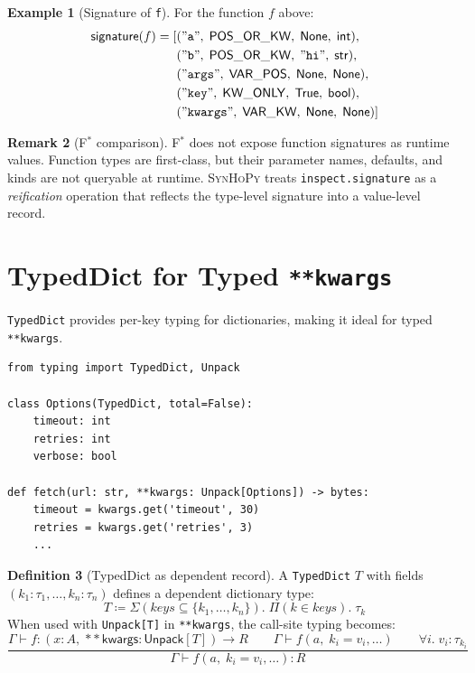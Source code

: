 \documentclass[11pt,a4paper]{report}
\theoremstyle{definition}
\newtheorem{definition}{Definition}[chapter]
\newtheorem{example}[definition]{Example}
\newtheorem{remark}[definition]{Remark}
\theoremstyle{plain}
\newcommand{\PyNone}{\mathsf{None}}
\newcommand{\defeq}{\coloneqq}
\newcommand{\fstar}{F$^{*}$}
\newcommand{\synhopy}{\textsc{SynHoPy}}
\begin{document}
\begin{example}[Signature of \texttt{f}]
For the function $f$ above:
\begin{align}
  \mathsf{signature}(f) = [
    &(\mathtt{"a"},\; \mathsf{POS\_OR\_KW},\; \PyNone,\; \mathsf{int}), \\
    &(\mathtt{"b"},\; \mathsf{POS\_OR\_KW},\; \mathtt{"hi"},\; \mathsf{str}), \\
    &(\mathtt{"args"},\; \mathsf{VAR\_POS},\; \PyNone,\; \PyNone), \\
    &(\mathtt{"key"},\; \mathsf{KW\_ONLY},\; \mathsf{True},\; \mathsf{bool}), \\
    &(\mathtt{"kwargs"},\; \mathsf{VAR\_KW},\; \PyNone,\; \PyNone)
  ]
\end{align}
\end{example}

\begin{remark}[\fstar{} comparison]
\fstar{} does not expose function signatures as runtime values.
Function types are first-class, but their parameter names, defaults, and
kinds are not queryable at runtime.  \synhopy{} treats
\lstinline[style=python]{inspect.signature} as a \emph{reification}
operation that reflects the type-level signature into a value-level record.
\end{remark}

\section{TypedDict for Typed \texttt{**kwargs}}

\lstinline[style=python]{TypedDict} provides per-key typing for
dictionaries, making it ideal for typed \texttt{**kwargs}.

\begin{lstlisting}[style=python]
from typing import TypedDict, Unpack

class Options(TypedDict, total=False):
    timeout: int
    retries: int
    verbose: bool

def fetch(url: str, **kwargs: Unpack[Options]) -> bytes:
    timeout = kwargs.get('timeout', 30)
    retries = kwargs.get('retries', 3)
    ...
\end{lstlisting}

\begin{definition}[TypedDict as dependent record]
\label{def:typeddict-kwargs}
A \lstinline[style=python]{TypedDict} $T$ with fields
$(k_1 : \tau_1, \ldots, k_n : \tau_n)$ defines a dependent dictionary type:
\[
  T \defeq \Sigma(\mathit{keys} \subseteq \{k_1, \ldots, k_n\}).\;
    \Pi(k \in \mathit{keys}).\; \tau_k
\]
When used with \lstinline[style=python]{Unpack[T]} in \texttt{**kwargs},
the call-site typing becomes:
\[
  \frac{
    \Gamma \vdash f : (x : A,\; \mathsf{**kwargs}: \mathsf{Unpack}[T]) \to R
    \qquad
    \Gamma \vdash f(a,\; k_i\!=\!v_i, \ldots)
    \qquad
    \forall i.\; v_i : \tau_{k_i}
  }{
    \Gamma \vdash f(a,\; k_i\!=\!v_i, \ldots) : R
  }
\]
\end{definition}
\end{document}
